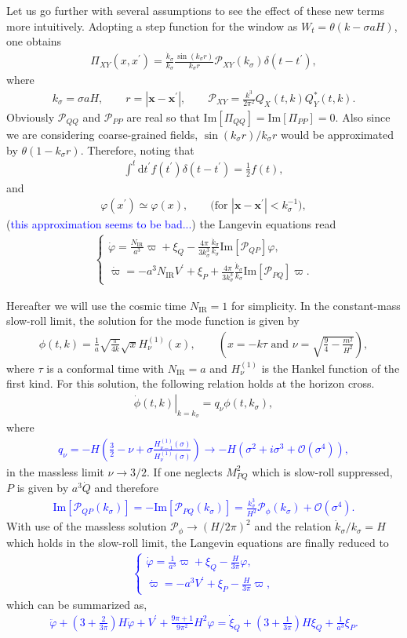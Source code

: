 \documentclass[aps, prd
, preprint
, nofootinbib 
]{revtex4-1}
\newcommand{\dd}{\mathrm{d}}
\newcommand{\calP}{\mathcal{P}}
\newcommand{\IR}{\text{IR}}
\renewcommand{\Im}{\mathrm{Im}}
\newcommand{\dps}{\displaystyle}
\newcommand{\bae}[1]{\begin{align} #1 \end{align}}
\newcommand{\bce}[1]{\begin{cases} #1 \end{cases}}
\newcommand{\Blue}[1]{\textcolor{blue}{\sffamily #1}}
\begin{document}
Let us go further with several assumptions to see the effect of these new terms more intuitively. 
Adopting a step function for the window as $W_t=\theta(k-\sigma aH)$, one obtains
\bae{
	\Pi_{XY}(x,x^\prime)=\frac{\dot{k}_\sigma}{k_\sigma}\frac{\sin(k_\sigma r)}{k_\sigma r}\calP_{XY}(k_\sigma)\delta(t-t^\prime),
}
where
\bae{
	k_\sigma=\sigma aH, \quad\quad r=|\mathbf{x}-\mathbf{x}^\prime|, \quad\quad \calP_{XY}=\frac{k^3}{2\pi^2}Q_X(t,k)Q_Y^*(t,k).
}
Obviously $\calP_{QQ}$ and $\calP_{PP}$ are real so that $\Im[\Pi_{QQ}]=\Im[\Pi_{PP}]=0$.
Also since we are considering coarse-grained fields, $\sin(k_\sigma r)/k_\sigma r$ would be approximated by $\theta(1-k_\sigma r)$.
Therefore, noting that
\bae{\label{eq: edge integral of delta}
	\int^t\dd t^\prime f(t^\prime)\delta(t-t^\prime)=\frac{1}{2}f(t),
}
and 
\bae{\label{eq: tophat approx}
	\varphi(x^\prime)\simeq\varphi(x), \quad\quad \text{(for $|\mathbf{x}-\mathbf{x}^\prime|<k_\sigma^{-1}$)},
}
(\Blue{this approximation seems to be bad...})
the Langevin equations read
\bae{
	\bce{
		\dps
		\dot{\varphi}=\frac{N_\IR}{a^3}\varpi+\xi_Q-\frac{4\pi}{3k_\sigma^3}\frac{\dot{k}_\sigma}{k_\sigma}\Im[\calP_{QP}]\varphi, \\[10pt]
		\dps
		\dot{\varpi}=-a^3N_\IR V^\prime+\xi_P+\frac{4\pi}{3k_\sigma^3}\frac{\dot{k}_\sigma}{k_\sigma}\Im[\calP_{PQ}]\varpi.
	}
}

Hereafter we will use the cosmic time $N_\IR=1$ for simplicity.
In the constant-mass slow-roll limit, the solution for the mode function is given by
\bae{
	\phi(t,k)=\frac{1}{a}\sqrt{\frac{\pi}{4k}}\sqrt{x}H_\nu^{(1)}(x), \quad\quad 
	\left(\text{$x=-k\tau$ and $\nu=\sqrt{\frac{9}{4}-\frac{m^2}{H^2}}$}\right),
}
where $\tau$ is a conformal time with $N_\IR=a$ and $H_\nu^{(1)}$ is the Hankel function of the first kind.
For this solution, the following relation holds at the horizon cross.
\bae{
	\left.\dot{\phi}(t,k)\right|_{k=k_\sigma}=q_\nu\phi(t,k_\sigma),
}
where
\Blue{
\bae{
	q_\nu=-H\left(\frac{3}{2}-\nu+\sigma\frac{H_{\nu-1}^{(1)}(\sigma)}{H_\nu^{(1)}(\sigma)}\right)
	\to -H\left(\sigma^2+i\sigma^3+\mathcal{O}(\sigma^4)\right),
}}
in the massless limit $\nu\to3/2$.
If one neglects $M_{PQ}^2$ which is slow-roll suppressed, $P$ is given by $a^3\dot{Q}$ and therefore
\Blue{
\bae{\label{eq: calPQP}
	\Im[\calP_{QP}(k_\sigma)]=-\Im[\calP_{PQ}(k_\sigma)]=\frac{k_\sigma^3}{H^2}\calP_\phi(k_\sigma)+\mathcal{O}(\sigma^4).
}}
With use of the massless solution $\calP_\phi\to(H/2\pi)^2$ and the relation $\dot{k}_\sigma/k_\sigma=H$ which holds in the slow-roll limit,
the Langevin equations are finally reduced to
\Blue{
\bae{
	\bce{
		\dps
		\dot{\varphi}=\frac{1}{a^3}\varpi+\xi_Q-\frac{H}{3\pi}\varphi, \\[10pt]
		\dps
		\dot{\varpi}=-a^3V^\prime+\xi_P-\frac{H}{3\pi}\varpi,
	}
}}
which can be summarized as,
\Blue{
\bae{
	\ddot{\varphi}+\left(3+\frac{2}{3\pi}\right)H\dot{\varphi}+V^\prime+\frac{9\pi+1}{9\pi^2}H^2\varphi
	=\dot{\xi}_Q+\left(3+\frac{1}{3\pi}\right)H\xi_Q+\frac{1}{a^3}\xi_P.
}}
\end{document}
